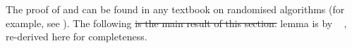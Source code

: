 \documentclass[11pt]{article}
\providecommand{\DIFadd}[1]{\textcolor{shin-ryoku}{#1}}%
\providecommand{\DIFdel}[1]{\textcolor{verylightgray}{\sout{#1}}}                      %
\providecommand{\DIFaddbegin}{} %
\providecommand{\DIFdelbegin}{} %
\providecommand{\DIFdelend}{} %
\begin{document}




The proof of  and 
can be found in any textbook on randomised algorithms (for example, see \citep[Chapter 1, Chapter 7]{mitzenmacher2017probability}). 
The following \DIFdelbegin \DIFdel{is the main result of this section.
}\DIFdelend \DIFaddbegin \DIFadd{lemma is by \mbox{%
\citep[Lemma 4.3]{Austrin_2022}}\hskip0pt%
, re-derived here for completeness.
}
\end{document}
